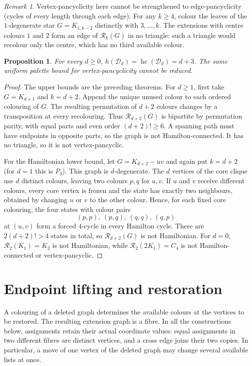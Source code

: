 \documentclass[11pt]{article}
\newtheorem{proposition}[theorem]{Proposition}
\theoremstyle{remark}
\newtheorem{remark}[theorem]{Remark}
\newcommand{\R}{\mathcal R}
\newcommand{\Rk}{\mathcal R_k}
\newcommand{\hc}{\operatorname{hc}}
\numberwithin{equation}{section}
\numberwithin{table}{section}
\begin{document}
\begin{remark}\label{rem:not-edge-pancyclic}
Vertex-pancyclicity here cannot be strengthened to edge-pancyclicity
(cycles of every length through each edge). For any $k\ge4$, colour the
leaves of the $1$-degenerate star $G=K_{1,k-2}$ distinctly with
$3,\ldots,k$. The extensions with centre colours $1$ and $2$ form an
edge of $\Rk(G)$ in no triangle: such a triangle would recolour only
the centre, which has no third available colour.
\end{remark}


\begin{proposition}\label{prop:degenerate-sharp}
For every $d\ge0$, $h(\mathcal D_d)=\hc(\mathcal D_d)=d+3$. The same uniform palette
bound for vertex-pancyclicity cannot be reduced.
\end{proposition}
\begin{proof}
The upper bounds are the preceding theorems. For $d\ge1$, first take
$G=K_{d+1}$ and $k=d+2$. Append the unique unused colour to each
ordered colouring of $G$. The resulting permutation of $d+2$ colours
changes by a transposition at every recolouring. Thus $\R_{d+2}(G)$
is bipartite by permutation parity, with equal parts and even order
$(d+2)!\ge6$. A spanning path must have endpoints in opposite parts,
so the graph is not Hamilton-connected. It has no triangle, so it is
not vertex-pancyclic.

For the Hamiltonian lower bound, let $G=K_{d+2}-uv$ and again put
$k=d+2$ (for $d=1$ this is $P_3$). This graph is $d$-degenerate. The
$d$ vertices of the core clique use $d$ distinct colours,
leaving two colours $p,q$ for $u,v$. If $u$ and $v$ receive different
colours, every core vertex is frozen and the state has exactly two
neighbours, obtained by changing $u$ or $v$ to the other colour. Hence,
for each fixed core colouring, the four states with colour pairs
\[
 (p,p),\ (p,q),\ (q,q),\ (q,p)
\]
at $(u,v)$ form a forced $4$-cycle in every Hamilton cycle. There are
$2(d+2)!>4$ states in total, so $\R_{d+2}(G)$ is not Hamiltonian. For
$d=0$, $\R_2(K_1)=K_2$ is not Hamiltonian, while
$\R_2(2K_1)=C_4$ is not Hamilton-connected or vertex-pancyclic.
\end{proof}

\section{Endpoint lifting and restoration}
\label{sec:restoration}

A colouring of a deleted graph determines the available colours at the
vertices to be restored.  The resulting extension graph is a fibre.  In
all the constructions below, assignments retain their actual coordinate
values: equal assignments in two different fibres are distinct vertices,
and a cross edge joins their two copies.  In particular, a move of one
vertex of the deleted graph may change several available lists at once.
\end{document}
